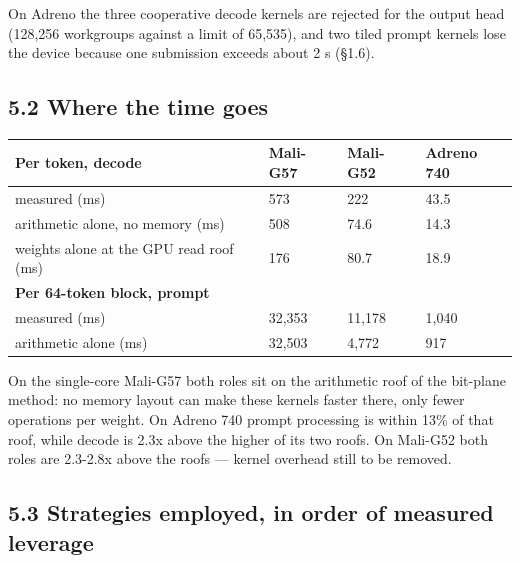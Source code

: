 \documentclass[
  10pt,
]{article}
\newcounter{none} %
\begin{document}
On Adreno the three cooperative decode kernels are rejected for the
output head (128,256 workgroups against a limit of 65,535), and two
tiled prompt kernels lose the device because one submission exceeds
about 2 s (\S{}1.6).

\subsection{5.2 Where the time goes}\label{where-the-time-goes}

{\def\LTcaptype{none} %
\begin{longtable}[]{@{}llll@{}}
\toprule\noalign{}
Per token, decode & Mali-G57 & Mali-G52 & Adreno 740 \\
\midrule\noalign{}
\endhead%
\bottomrule\noalign{}
\endlastfoot%
measured (ms) & 573 & 222 & 43.5 \\
arithmetic alone, no memory (ms) & 508 & 74.6 & 14.3 \\
weights alone at the GPU read roof (ms) & 176 & 80.7 & 18.9 \\
\textbf{Per 64-token block, prompt} & & & \\
measured (ms) & 32,353 & 11,178 & 1,040 \\
arithmetic alone (ms) & 32,503 & 4,772 & 917 \\
\end{longtable}
}

On the single-core Mali-G57 both roles sit on the arithmetic roof of the
bit-plane method: no memory layout can make these kernels faster there,
only fewer operations per weight. On Adreno 740 prompt processing is
within 13\% of that roof, while decode is 2.3x above the higher of its
two roofs. On Mali-G52 both roles are 2.3-2.8x above the roofs ---
kernel overhead still to be removed.

\subsection{5.3 Strategies employed, in order of measured
leverage}\label{strategies-employed-in-order-of-measured-leverage}
\end{document}
